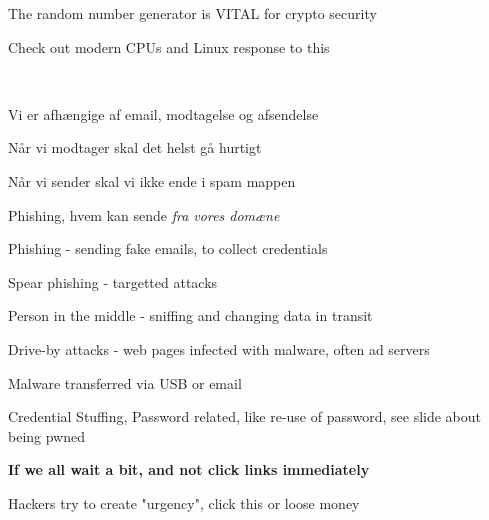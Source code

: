 \documentclass[Screen16to9,17pt]{foils}
\begin{document}




{\small{}}

\centerline{The random number generator is VITAL for crypto security}

Check out modern CPUs and Linux response to this\\



{~}

\begin{list2}
\item Vi er afhængige af email, modtagelse og afsendelse
\item Når vi modtager skal det helst gå hurtigt
\item Når vi sender skal vi ikke ende i spam mappen
\item Phishing, hvem kan sende \emph{fra vores domæne}
\end{list2}



\begin{list2}
\item Phishing - sending fake emails, to collect credentials
\item Spear phishing - targetted attacks
\item Person in the middle - sniffing and changing data in transit
\item Drive-by attacks - web pages infected with malware, often ad servers
\item Malware transferred via USB or email
\item Credential Stuffing, Password related, like re-use of password, see slide about being pwned
\end{list2}

\vskip 1cm
\centerline{\Large\bf If we all wait a bit, and not click links immediately}

\vskip 1cm
Hackers try to create "urgency", click this or loose money

\end{document}
